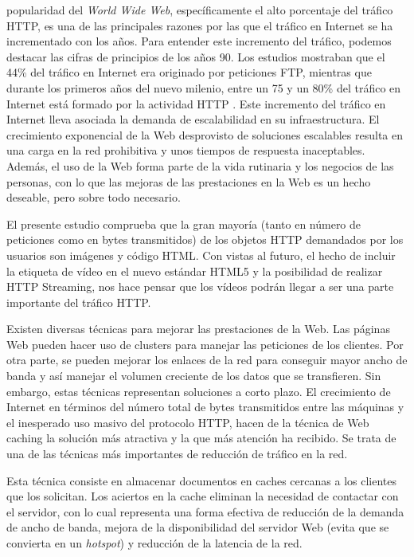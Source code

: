 \documentclass[twocolumn]{Jornadas}
\begin{document}
 popularidad del \emph{World Wide Web}, específicamente el alto porcentaje del tráfico HTTP, es una de las principales razones por las que el tráfico en Internet se ha incrementado con los años. Para entender este incremento del tráfico, podemos destacar las cifras de principios de los años 90. Los estudios mostraban que el 44\% del tráfico en Internet era originado por peticiones FTP, mientras que durante los primeros años del nuevo milenio, entre un 75 y un 80\% del tráfico en Internet está formado por la actividad HTTP \cite{barish}. Este incremento del tráfico en Internet lleva asociada la demanda de escalabilidad en su infraestructura. El crecimiento exponencial de la Web desprovisto de soluciones escalables resulta en una carga en la red prohibitiva y unos tiempos de respuesta inaceptables. Además, el uso de la Web forma parte de la vida rutinaria y los negocios de las personas, con lo que las mejoras de las prestaciones en la Web es un hecho deseable, pero sobre todo necesario.

El presente estudio comprueba que la gran mayoría (tanto en número de peticiones como en bytes transmitidos) de los objetos HTTP demandados por los usuarios son imágenes y código HTML. Con vistas al futuro, el hecho de incluir la etiqueta de vídeo en el nuevo estándar HTML5 y la posibilidad de realizar HTTP Streaming, nos hace pensar que los vídeos podrán llegar a ser una parte importante del tráfico HTTP.

Existen diversas técnicas para mejorar las prestaciones de la Web. Las páginas Web pueden hacer uso de clusters para manejar las peticiones de los clientes. Por otra parte, se pueden mejorar los enlaces de la red para conseguir mayor ancho de banda y así manejar el volumen creciente de los datos que se transfieren. Sin embargo, estas técnicas representan soluciones a corto plazo. El crecimiento de Internet en términos del número total de bytes transmitidos entre las máquinas y el inesperado uso masivo del protocolo HTTP, hacen de la técnica de Web caching la solución más atractiva y la que más atención ha recibido. Se trata de una de las técnicas más importantes de reducción de tráfico en la red.

Esta técnica consiste en almacenar documentos en caches cercanas a los clientes que los solicitan. Los aciertos en la cache eliminan la necesidad de contactar con el servidor, con lo cual representa una forma efectiva de reducción de la demanda de ancho de banda, mejora de la disponibilidad del servidor Web (evita que se convierta en un \emph{hotspot}) y reducción de la latencia de la red.
\end{document}
